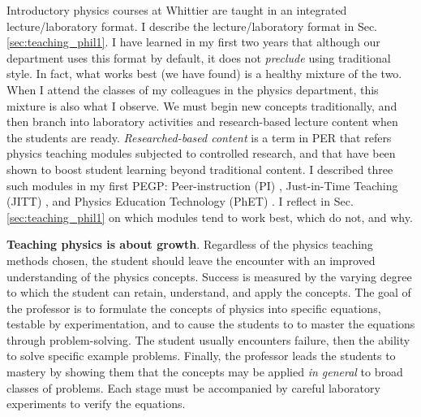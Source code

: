 \documentclass[../../main.tex]{subfiles}
\begin{document}
Introductory physics courses at Whittier are taught in an integrated lecture/laboratory format.  I describe the lecture/laboratory format in Sec. \ref{sec:teaching_phil1}.  I have learned in my first two years that although our department uses this format by default, it does not \textit{preclude} using traditional style.  In fact, what works best (we have found) is a healthy mixture of the two.  When I attend the classes of my colleagues in the physics department, this mixture is also what I observe.  We must begin new concepts traditionally, and then branch into laboratory activities and research-based lecture content when the students are ready.  \textit{Researched-based content} is a term in PER that refers physics teaching modules subjected to controlled research, and that have been shown to boost student learning beyond traditional content.  I described three such modules in my first PEGP: Peer-instruction (PI) \cite{mazur2013peer}, Just-in-Time Teaching (JITT) \cite{jitt}, and Physics Education Technology (PhET) \cite{phet}.  I reflect in Sec. \ref{sec:teaching_phil1} on which modules tend to work best, which do not, and why. \\ \hspace{0.1cm}

\textbf{Teaching physics is about growth}.  Regardless of the physics teaching methods chosen, the student should leave the encounter with an improved understanding of the physics concepts.  Success is measured by the varying degree to which the student can retain, understand, and apply the concepts.  The goal of the professor is to formulate the concepts of physics into specific equations, testable by experimentation, and to cause the students to to master the equations through problem-solving.  The student usually encounters failure, then the ability to solve specific example problems.  Finally, the professor leads the students to mastery by showing them that the concepts may be applied \textit{in general} to broad classes of problems. Each stage must be accompanied by careful laboratory experiments to verify the equations. \\ \hspace{0.1cm}
\end{document}
